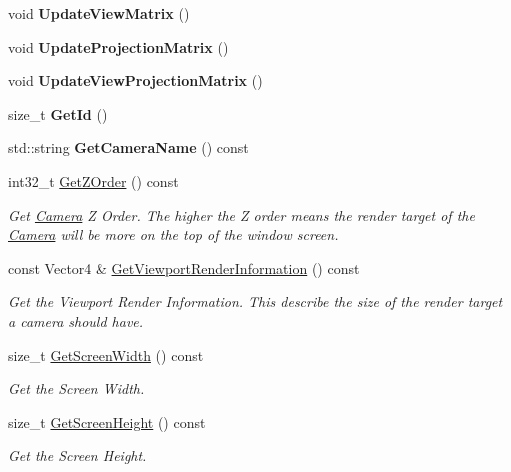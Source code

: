 \begin{DoxyCompactItemize}
\mbox{\label{classCamera_a69369efae2a33da50510cc8c43c58bc5}} 
void {\bfseries Update\+View\+Matrix} ()
\item 
\mbox{\label{classCamera_a619c58dc226f1489502c9ed33ad87323}} 
void {\bfseries Update\+Projection\+Matrix} ()
\item 
\mbox{\label{classCamera_a44f25453a2a87f32d325f88bf3686add}} 
void {\bfseries Update\+View\+Projection\+Matrix} ()
\item 
\mbox{\label{classCamera_a863a3a0132d64395c04a418e0f6174a3}} 
size\+\_\+t {\bfseries Get\+Id} ()
\item 
\mbox{\label{classCamera_a1b4079998b211f9bed22323564e2f875}} 
std\+::string {\bfseries Get\+Camera\+Name} () const
\item 
int32\+\_\+t \hyperlink{classCamera_a6c981b26fc23315fcc7e6776d7dee4ae}{Get\+Z\+Order} () const
\begin{DoxyCompactList}\small\item\em Get \hyperlink{classCamera}{Camera} Z Order. The higher the Z order means the render target of the \hyperlink{classCamera}{Camera} will be more on the top of the window screen. \end{DoxyCompactList}\item 
const Vector4 \& \hyperlink{classCamera_a055588d001b70381c0d5eaccdf9f7ece}{Get\+Viewport\+Render\+Information} () const
\begin{DoxyCompactList}\small\item\em Get the Viewport Render Information. This describe the size of the render target a camera should have. \end{DoxyCompactList}\item 
size\+\_\+t \hyperlink{classCamera_aa2812325bada4a9c1955f005c125b313}{Get\+Screen\+Width} () const
\begin{DoxyCompactList}\small\item\em Get the Screen Width. \end{DoxyCompactList}\item 
size\+\_\+t \hyperlink{classCamera_ad6bf28a11aa95a86497ad1e0d476d95b}{Get\+Screen\+Height} () const
\begin{DoxyCompactList}\small\item\em Get the Screen Height. \end{DoxyCompactList}\item 

\end{DoxyCompactItemize}
